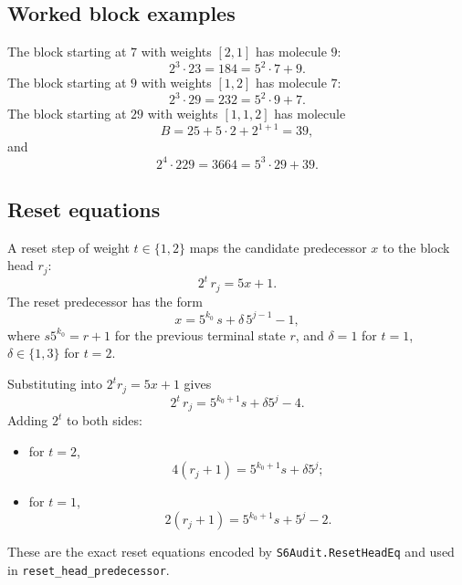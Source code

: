 \subsection{Worked block examples}

The block starting at $7$ with weights $[2,1]$ has molecule $9$:
\begin{equation*}
  2^3\cdot23=184=5^2\cdot7+9.
\end{equation*}
The block starting at $9$ with weights $[1,2]$ has molecule $7$:
\begin{equation*}
  2^3\cdot29=232=5^2\cdot9+7.
\end{equation*}
The block starting at $29$ with weights $[1,1,2]$ has molecule
\begin{equation*}
  B=25+5\cdot2+2^{1+1}=39,
\end{equation*}
and
\begin{equation*}
  2^4\cdot229=3664=5^3\cdot29+39.
\end{equation*}

\subsection{Reset equations}

A reset step of weight $t\in\{1,2\}$ maps the candidate predecessor
$x$ to the block head $r_j$:
\begin{equation*}
  2^t\,r_j=5x+1.
\end{equation*}
The reset predecessor has the form
\begin{equation*}
  x=5^{k_0}\,s+\delta\,5^{j-1}-1,
\end{equation*}
where $s5^{k_0}=r+1$ for the previous terminal state $r$, and
$\delta=1$ for $t=1$, $\delta\in\{1,3\}$ for $t=2$.

Substituting into $2^tr_j=5x+1$ gives
\begin{equation*}
  2^t\,r_j=5^{k_0+1}s+\delta5^j-4.
\end{equation*}
Adding $2^t$ to both sides:
\begin{itemize}[leftmargin=*]
\item for $t=2$,
  \begin{equation*}
    4(r_j+1)=5^{k_0+1}s+\delta5^j;
  \end{equation*}
\item for $t=1$,
  \begin{equation*}
    2(r_j+1)=5^{k_0+1}s+5^j-2.
  \end{equation*}
\end{itemize}
These are the exact reset equations encoded by
\texttt{S6Audit.ResetHeadEq} and used in
\texttt{reset\_\allowbreak head\_\allowbreak predecessor}.

